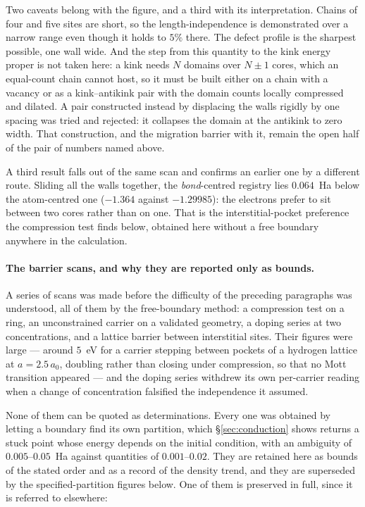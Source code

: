 \documentclass[11pt]{article}
\begin{document}
Two caveats belong with the figure, and a third with its interpretation. Chains of four and five
sites are short, so the length-independence is demonstrated over a narrow range even though it
holds to $5\%$ there. The defect profile is the sharpest possible, one wall wide. And the step from
this quantity to the kink energy proper is not taken here: a kink needs $N$ domains over $N\pm1$
cores, which an equal-count chain cannot host, so it must be built either on a chain with a vacancy
or as a kink--antikink pair with the domain counts locally compressed and dilated. A pair
constructed instead by displacing the walls rigidly by one spacing was tried and rejected: it
collapses the domain at the antikink to zero width. That construction, and the migration barrier
with it, remain the open half of the pair of numbers named above.

A third result falls out of the same scan and confirms an earlier one by a different route. Sliding
all the walls together, the \emph{bond}-centred registry lies $0.064$~Ha below the atom-centred one
($-1.364$ against $-1.29985$): the electrons prefer to sit between two cores rather than on one.
That is the interstitial-pocket preference the compression test finds below, obtained here without
a free boundary anywhere in the calculation.

\paragraph{The barrier scans, and why they are reported only as bounds.} A series of scans was made
before the difficulty of the preceding paragraphs was understood, all of them by the free-boundary
method: a compression test on a ring, an unconstrained carrier on a validated geometry, a doping
series at two concentrations, and a lattice barrier between interstitial sites. Their figures were
large --- around $5$~eV for a carrier stepping between pockets of a hydrogen lattice at
$a=2.5\,a_0$, doubling rather than closing under compression, so that no Mott transition appeared
--- and the doping series withdrew its own per-carrier reading when a change of concentration
falsified the independence it assumed.

None of them can be quoted as determinations. Every one was obtained by letting a boundary find its
own partition, which \S\ref{sec:conduction} shows returns a stuck point whose energy depends on the
initial condition, with an ambiguity of $0.005$--$0.05$~Ha against quantities of $0.001$--$0.02$.
They are retained here as bounds of the stated order and as a record of the density trend, and they
are superseded by the specified-partition figures below. One of them is preserved in full, since it
is referred to elsewhere:
\end{document}
